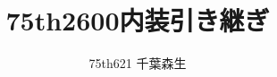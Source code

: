 \documentclass{jsarticle}
\begin{document}
\title{75th2600内装引き継ぎ}
\author{75th621 千葉森生}
\maketitle
\end{document}

